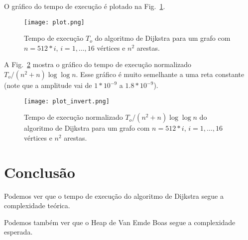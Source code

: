 \documentclass{article}
\begin{document}
O gráfico do tempo de execução é plotado na Fig.~\ref{fig1}.

\begin{figure}
  \centering
  \texttt{[image: plot.png]}
  \caption{Tempo de execução $T_o$ do algoritmo de Dijkstra para um grafo com $n=512 * i$, $i=1,\ldots,16$ vértices e $n ^ 2$ arestas.}
  \label{fig1}
\end{figure}

A Fig.~\ref{fig2} mostra o gráfico do tempo de execução normalizado $T_o/(n^2+n)\log\log n$. Esse gráfico é muito semelhante a uma reta constante (note que a amplitude vai de $1*10 ^ {-9}$ a $1.8 * 10 ^ {-9}$).

\begin{figure}
  \centering
  \texttt{[image: plot\_invert.png]}
  \caption{Tempo de execução normalizado $T_o/(n^2+n)\log\log n$ do algoritmo de Dijkstra para um grafo com $n=512 * i$, $i=1,\ldots,16$ vértices e $n ^ 2$ arestas.}
  \label{fig2}
\end{figure}

\section{Conclusão}

Podemos ver que o tempo de execução do algoritmo de Dijkstra segue a complexidade teórica.

Podemos também ver que o Heap de Van Emde Boas segue a complexidade esperada.

\printbibliography
\end{document}
